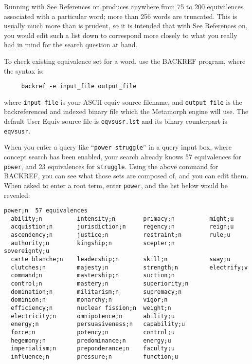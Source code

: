 Running with See References on produces anywhere from 75 to 200
equivalences associated with a particular word; more than 256 words
are truncated.  This is usually much more than is prudent, so it is
intended that with See References on, you would edit such a list down
to correspond more closely to what you really had in mind for the
search question at hand.

To check existing equivalence set for a word, use the BACKREF program,
where the syntax is:

\begin{verbatim}
     backref -e input_file output_file
\end{verbatim}

where \verb`input_file` is your ASCII equiv source filename, and
\verb`output_file` is the backreferenced and indexed binary file which
the Metamorph engine will use.  The default User Equiv source file is
\verb`eqvsusr.lst` and its binary counterpart is \verb`eqvsusr`.

When you enter a query like ``\verb`power struggle`'' in a query input
box, where concept search has been enabled, your search already knows
57 equivalences for \verb`power`, and 23 equivalences for
\verb`struggle`.  Using the above command for BACKREF, you can see
what those sets are composed of, and you can edit them.  When asked to
enter a root term, enter \verb`power`, and the list below would be
revealed:

\begin{screen}
\begin{verbatim}
power;n  57 equivalences
  ability;n          intensity;n        primacy;n          might;u
  acquistion;n       jurisdiction;n     regency;n          reign;u
  ascendency;n       justice;n          restraint;n        rule;u
  authority;n        kingship;n         scepter;n          sovereignty;u
  carte blanche;n    leadership;n       skill;n            sway;u
  clutches;n         majesty;n          strength;n         electrify;v
  command;n          mastership;n       suction;n
  control;n          mastery;n          superiority;n
  domination;n       militarism;n       supremacy;n
  dominion;n         monarchy;n         vigor;n
  efficiency;n       nuclear fission;n  weight;n
  electricity;n      omnipotence;n      ability;u
  energy;n           persuasiveness;n   capability;u
  force;n            potency;n          control;u
  hegemony;n         predominance;n     energy;u
  imperialism;n      preponderance;n    faculty;u
  influence;n        pressure;n         function;u
\end{verbatim}
\end{screen}

